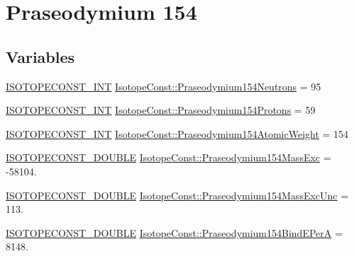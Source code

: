 \hypertarget{group___isotope_const-_praseodymium-_pr154}{}\section{Praseodymium 154}
\label{group___isotope_const-_praseodymium-_pr154}
\subsection*{Variables}
\begin{DoxyCompactItemize}
\item 
\mbox{\hyperlink{group___isotope_const-_macros_ga5f18360b3e99483a35c32d789e62621c}{I\+S\+O\+T\+O\+P\+E\+C\+O\+N\+S\+T\+\_\+\+I\+NT}} \mbox{\hyperlink{group___isotope_const-_praseodymium-_pr154_ga52f6343c7062aa5fe2253e0ea41abe25}{Isotope\+Const\+::\+Praseodymium154\+Neutrons}} = 95
\item 
\mbox{\hyperlink{group___isotope_const-_macros_ga5f18360b3e99483a35c32d789e62621c}{I\+S\+O\+T\+O\+P\+E\+C\+O\+N\+S\+T\+\_\+\+I\+NT}} \mbox{\hyperlink{group___isotope_const-_praseodymium-_pr154_gaede902db6712106a958d8b75bbbd04bb}{Isotope\+Const\+::\+Praseodymium154\+Protons}} = 59
\item 
\mbox{\hyperlink{group___isotope_const-_macros_ga5f18360b3e99483a35c32d789e62621c}{I\+S\+O\+T\+O\+P\+E\+C\+O\+N\+S\+T\+\_\+\+I\+NT}} \mbox{\hyperlink{group___isotope_const-_praseodymium-_pr154_ga7c949f7bb98c71fa87766cd60c363be3}{Isotope\+Const\+::\+Praseodymium154\+Atomic\+Weight}} = 154
\item 
\mbox{\hyperlink{group___isotope_const-_macros_ga8f45a7272ce02c0b4c65c44636ed719a}{I\+S\+O\+T\+O\+P\+E\+C\+O\+N\+S\+T\+\_\+\+D\+O\+U\+B\+LE}} \mbox{\hyperlink{group___isotope_const-_praseodymium-_pr154_gaa44e9711bb2c24c195af0e736a680b82}{Isotope\+Const\+::\+Praseodymium154\+Mass\+Exc}} = -\/58104.
\item 
\mbox{\hyperlink{group___isotope_const-_macros_ga8f45a7272ce02c0b4c65c44636ed719a}{I\+S\+O\+T\+O\+P\+E\+C\+O\+N\+S\+T\+\_\+\+D\+O\+U\+B\+LE}} \mbox{\hyperlink{group___isotope_const-_praseodymium-_pr154_ga3620ab96132e3d91c7044b077f41fc1a}{Isotope\+Const\+::\+Praseodymium154\+Mass\+Exc\+Unc}} = 113.
\item 
\mbox{\hyperlink{group___isotope_const-_macros_ga8f45a7272ce02c0b4c65c44636ed719a}{I\+S\+O\+T\+O\+P\+E\+C\+O\+N\+S\+T\+\_\+\+D\+O\+U\+B\+LE}} \mbox{\hyperlink{group___isotope_const-_praseodymium-_pr154_gac3553e7d46a83839ac74b33fa33a32b4}{Isotope\+Const\+::\+Praseodymium154\+Bind\+E\+PerA}} = 8148.

\end{DoxyCompactItemize}
